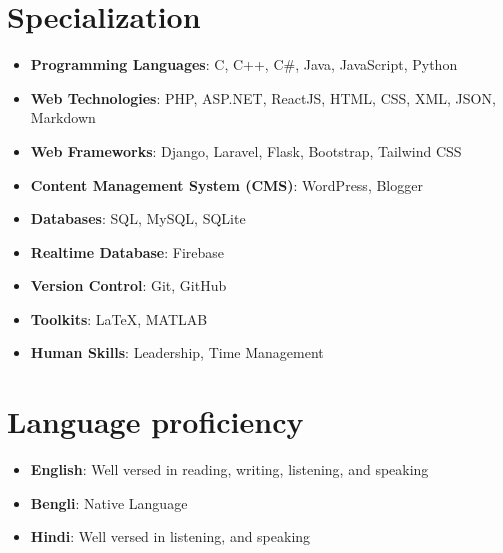 \documentclass[a4paper]{article}
\newcommand{\resumeItem}[2]{
  \item\small{
    \textbf{#1}{: #2 \vspace{-2pt}}
  }
}
\newcommand{\resumeSubItem}[2]{\resumeItem{#1}{#2}\vspace{-3pt}}
\newcommand{\resumeSubHeadingListStart}{\begin{itemize}[leftmargin=*]}
\newcommand{\resumeSubHeadingListEnd}{\end{itemize}}
\begin{document}
\section{Specialization}
	\resumeSubHeadingListStart
	\resumeSubItem{Programming Languages}{C, C++, C\#, Java, JavaScript, Python}
	\resumeSubItem{Web Technologies}{PHP, ASP.NET, ReactJS, HTML, CSS, XML, JSON, Markdown }
	\resumeSubItem{Web Frameworks}{Django, Laravel, Flask, Bootstrap, Tailwind CSS}
	\resumeSubItem{Content Management System (CMS)}{WordPress, Blogger}
	\resumeSubItem{Databases}{SQL, MySQL, SQLite}
	\resumeSubItem{Realtime Database}{Firebase}
	\resumeSubItem{Version Control}{Git, GitHub}
	\resumeSubItem{Toolkits}{LaTeX, MATLAB}
	\resumeSubItem{Human Skills}{Leadership, Time Management}
\resumeSubHeadingListEnd
\vspace{1pt}





\section{Language proficiency}
	\resumeSubHeadingListStart
	\resumeSubItem{English\hspace{2mm}}{Well versed in reading, writing, listening, and speaking}
	\resumeSubItem{Bengli\hspace{3.6mm}}{Native Language}
	\resumeSubItem{Hindi\hspace{4.7mm}}{Well versed in listening, and speaking}
\resumeSubHeadingListEnd
\vspace{1pt}
\end{document}
